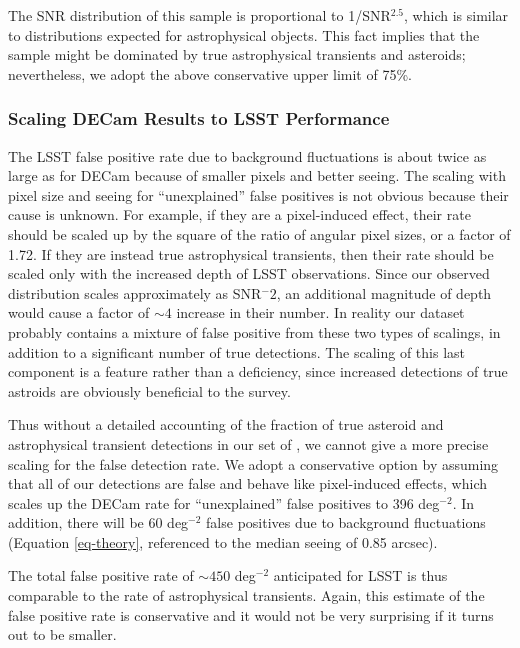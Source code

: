 The SNR distribution of this sample is proportional to 1/SNR$^{2.5}$, which
is similar to distributions expected for astrophysical objects. This fact implies
that the sample might be dominated by true astrophysical transients and
asteroids; nevertheless, we adopt the above conservative upper limit of 75\%.

\subsubsection{Scaling DECam Results to LSST Performance}

The LSST false positive rate due to background fluctuations is about twice
as large as for DECam because of smaller pixels and better seeing. The scaling
with pixel size and seeing for ``unexplained'' false positives is not obvious
because their cause is unknown. For example, if they are a pixel-induced effect,
their rate should be scaled up by the square of the ratio of angular pixel sizes, or
a factor of 1.72. If they are instead true astrophysical transients,
then their rate should be scaled only with the increased depth of LSST
observations. Since our observed \DIASource distribution scales approximately as
SNR$^-2$, an additional magnitude of depth would cause a factor of $\sim 4$
increase in their number. In reality our dataset probably contains a mixture of
false positive from these two types of scalings, in addition to a significant
number of true detections. The scaling of this last component is a feature
rather than a deficiency, since increased detections of true astroids are
obviously beneficial to the survey.

Thus without a detailed accounting of the fraction of true asteroid and
astrophysical transient detections in our set of \DIASources, we cannot give a
more precise scaling for the false detection rate. We adopt a conservative
option by assuming that all of our detections are false and behave like
pixel-induced effects, which scales up the DECam rate for ``unexplained'' false
positives to 396 deg$^{-2}$. In addition, there will be 60 deg$^{-2}$ false
positives due to background fluctuations (Equation \ref{eq-theory}, referenced
to the median seeing of 0.85 arcsec).

The total false positive rate of $\sim450$ deg$^{-2}$ anticipated for LSST is thus
comparable to the rate of astrophysical transients. Again, this estimate of the false
positive rate is conservative and it would not be very surprising if it turns out
to be smaller.


